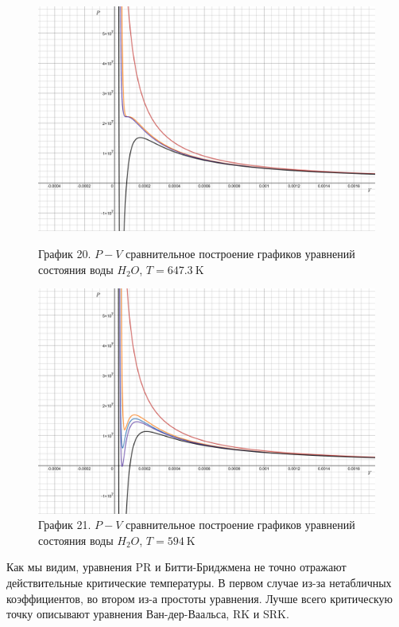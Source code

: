\documentclass[a4paper]{article}
\numberwithin{equation}{subsection} %
\begin{document}
\begin{figure}[h!]
    \centering
    \begin{minipage}{0.49\textwidth}
        \centering
        \includegraphics[width=\linewidth]{Graphics/H2O/647_3.png}
        \caption{\label{fig:clausius_1}График 20. $P-V$ сравнительное построение графиков уравнений состояния воды $H_2O$, $T = 647.3 \ \text{K}$}
    \end{minipage}
    \hfill
    \begin{minipage}{0.49\textwidth}
        \centering
        \includegraphics[width=\linewidth]{Graphics/H2O/594.png}
        \caption{\label{fig:clausius_1}График 21. $P-V$ сравнительное построение графиков уравнений состояния воды $H_2O$, $T = 594 \ \text{K}$}
    \end{minipage}
\end{figure}

Как мы видим, уравнения PR и Битти-Бриджмена не точно отражают действительные критические температуры. В первом случае из-за нетабличных коэффициентов, во втором из-а простоты уравнения. Лучше всего критическую точку описывают уравнения Ван-дер-Ваальса, RK и SRK.
\end{document}
